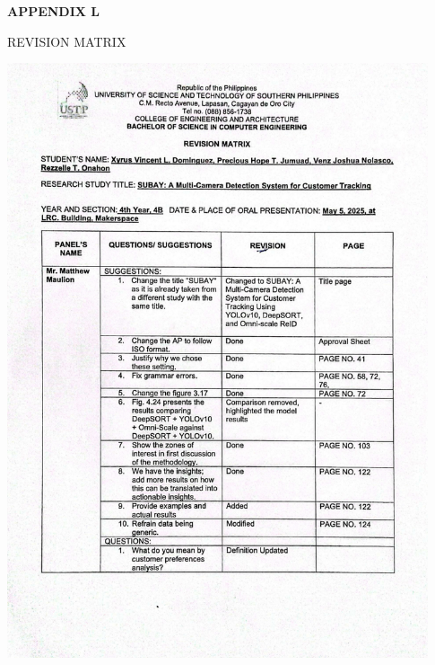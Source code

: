 \clearpage

\begin{center}
	{\bf APPENDIX L}
\end{center}

\begin{center}
	REVISION MATRIX
\end{center}

\begin{center}
	\includegraphics[width=0.93\textwidth]{app/L1.pdf}

\end{center}

